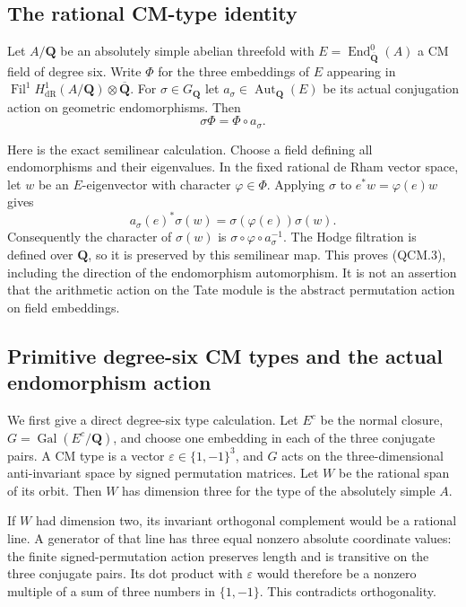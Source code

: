 \subsection*{The rational CM-type identity}
Let $A/\mathbf Q$ be an absolutely simple abelian threefold
with $E=\operatorname{End}^0_{\overline{\mathbf Q}}(A)$ a CM
field of degree six. Write $\Phi$ for the three embeddings
of $E$ appearing in
$\operatorname{Fil}^1H^1_{\mathrm{dR}}(A/\mathbf Q)
 \otimes\overline{\mathbf Q}$.
For $\sigma\in G_{\mathbf Q}$ let
$a_\sigma\in\operatorname{Aut}_{\mathbf Q}(E)$ be its actual
conjugation action on geometric endomorphisms. Then
\[
                            \sigma\Phi=\Phi\circ a_\sigma.    \tag{QCM.3}
\]

Here is the exact semilinear calculation. Choose a field
defining all endomorphisms and their eigenvalues. In the
fixed rational de Rham vector space, let $w$ be an
$E$-eigenvector with character $\varphi\in\Phi$. Applying
$\sigma$ to $e^*w=\varphi(e)w$ gives
\[
             a_\sigma(e)^*\sigma(w)
                        =\sigma(\varphi(e))\sigma(w).
\]
Consequently the character of $\sigma(w)$ is
$\sigma\circ\varphi\circ a_\sigma^{-1}$. The Hodge
filtration is defined over $\mathbf Q$, so it is preserved
by this semilinear map. This proves (QCM.3), including the
direction of the endomorphism automorphism. It is not an
assertion that the arithmetic action on the Tate module
is the abstract permutation action on field embeddings.

\subsection*{Primitive degree-six CM types and the actual endomorphism action}
We first give a direct degree-six type calculation.
Let $E^c$ be the normal closure, $G=\operatorname{Gal}(E^c/\mathbf Q)$,
and choose one embedding in each of the three conjugate
pairs. A CM type is a vector
$\varepsilon\in\{1,-1\}^3$, and $G$ acts on the
three-dimensional anti-invariant space by signed
permutation matrices. Let $W$ be the rational span of
its orbit. Then $W$ has dimension three for the type of
the absolutely simple $A$.

If $W$ had dimension two, its invariant orthogonal
complement would be a rational line. A generator of that
line has three equal nonzero absolute coordinate values:
the finite signed-permutation action preserves length
and is transitive on the three conjugate pairs. Its dot
product with $\varepsilon$ would therefore be a nonzero
multiple of a sum of three numbers in $\{1,-1\}$.
This contradicts orthogonality.

